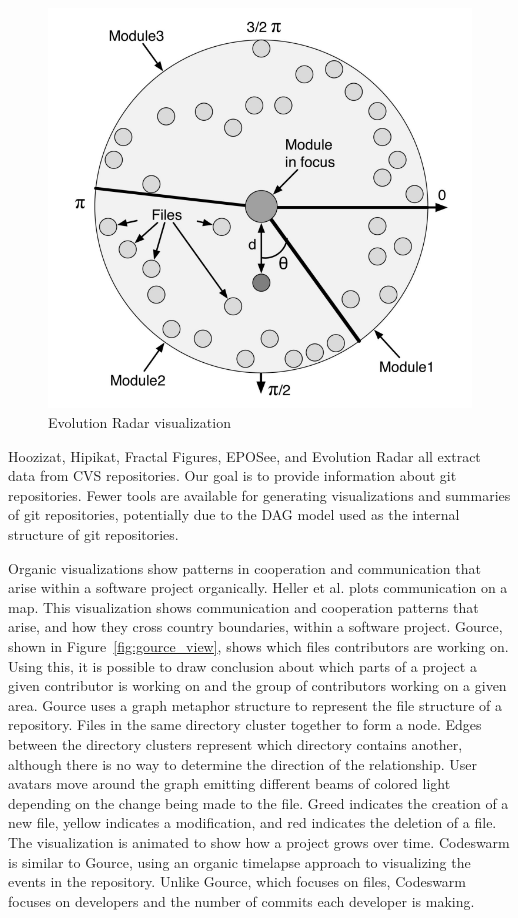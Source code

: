 \begin{figure}[htpb]
  \centering
  \includegraphics[width=0.8\linewidth]{Figures/introduction/evo_radar.png}
  \caption{Evolution Radar visualization}
  \label{fig:evolution_radar}
\end{figure}

Hoozizat, Hipikat, Fractal Figures, EPOSee, and Evolution Radar all
extract data from CVS repositories. Our goal is to provide information
about git repositories. Fewer tools are available for generating
visualizations and summaries of git repositories, potentially due to the
DAG model used as the internal structure of git repositories.

Organic visualizations show patterns in cooperation and communication
that arise within a software project organically. Heller et
al.\cite{Heller2011} plots communication on a map. This visualization
shows communication and cooperation patterns that arise, and how they
cross country boundaries, within a software project.
Gource\cite{Caudwell2010}, shown in Figure~\ref{fig:gource_view}, shows
which files contributors are working on. Using this, it is possible to
draw conclusion about which parts of a project a given contributor is
working on and the group of contributors working on a given area. Gource
uses a graph metaphor structure to represent the file structure of a
repository. Files in the same directory cluster together to form a node.
Edges between the directory clusters represent which directory contains
another, although there is no way to determine the direction of the
relationship. User avatars move around the graph emitting different
beams of colored light depending on the change being made to the file.
Greed indicates the creation of a new file, yellow indicates a
modification, and red indicates the deletion of a file. The
visualization is animated to show how a project grows over time.
Codeswarm\cite{ogawa09} is similar to Gource, using an organic timelapse
approach to visualizing the events in the repository. Unlike Gource,
which focuses on files, Codeswarm focuses on developers and the number
of commits each developer is making.

